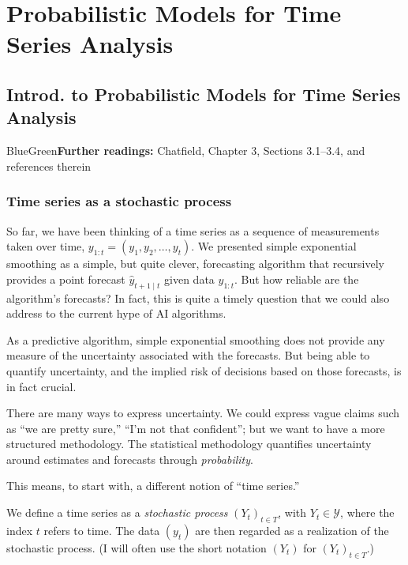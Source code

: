 \documentclass[dvipsnames,12pt]{book}
\begin{document}
\part{Probabilistic Models for Time Series Analysis}

    \chapter[Introd. to Probabilistic Models]{Introd. to Probabilistic Models for Time Series Analysis}

        \begin{mybox}{BlueGreen}{\textbf{Further readings:}}
            Chatfield, Chapter 3, Sections 3.1–3.4, and references therein
        \end{mybox}

        \section{Time series as a stochastic process}

            So far, we have been thinking of a time series as a sequence of measurements taken over time, $y_{1:t} = (y_1, y_2, \ldots, y_t)$. We presented simple exponential smoothing as a simple, but quite clever, forecasting algorithm that recursively provides a point forecast $\hat{y}_{t+1\mid t}$ given data $y_{1:t}$. But how reliable are the algorithm's forecasts? In fact, this is quite a timely question that we could also address to the current hype of AI algorithms. 
            
            As a predictive algorithm, simple exponential smoothing does not provide any  measure of the uncertainty associated with the forecasts. But being able to quantify uncertainty, and the implied risk of decisions based on those forecasts,  is in fact crucial.  
            
            There are many ways to express uncertainty. We could express vague claims such as ``we are pretty sure,'' ``I'm not that confident''; but we want to have a more structured methodology. The statistical methodology quantifies uncertainty around estimates and forecasts through \emph{probability}. 
            
            This means, to start with, a different notion of ``time series.'' 

            \begin{definition}
                We define a time series as a \emph{stochastic process} $(Y_t)_{t \in T}$, with $Y_t \in \mathcal{Y}$, where the index $t$ refers to time. The data $(y_t)$ are then regarded as a realization of the stochastic process. (I will often use the short notation $(Y_t)$ for $(Y_t)_{t \in T}$.) 
            \end{definition}
            
\end{document}
